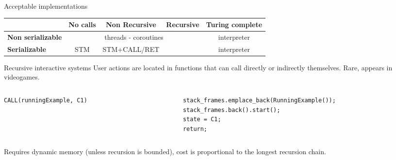 \documentclass[aspectratio=169,11pt]{beamer}
\begin{document}
\begin{frame}{Acceptable implementations}
\renewcommand{\arraystretch}{1.3} %
\setlength{\tabcolsep}{3pt}       %


\begin{tabularx}{\textwidth}{l|c|c|c|c}
\hline
 & \textbf{No calls}
 & \textbf{Non Recursive}
 & \textbf{Recursive}
 & \textbf{Turing complete} \\
\hline
    \textbf{Non serializable}       &  \multicolumn{3}{|c|}{threads - coroutines} & interpreter  \\
\hline
\textbf{Serializable}        & STM & STM+CALL/RET &  &  interpreter \\
\hline
\end{tabularx}
\end{frame}

\begin{frame}{Recursive interactive systems}
User actions are located in functions that can call directly or indirectly themselves.
Rare, appears in videogames.
\begin{columns}[T,onlytextwidth]
\begin{column}{0.50\textwidth}
\begin{lstlisting}[style=cppstyle, numbers=none]
CALL(runningExample, C1)
\end{lstlisting}
\end{column}
\begin{column}{0.48\textwidth}
\begin{lstlisting}[style=cppstyle, numbers=none]
stack_frames.emplace_back(RunningExample());
stack_frames.back().start();
state = C1;
return;
\end{lstlisting}
\end{column}
\end{columns}


Requires dynamic memory (unless recursion is bounded), cost is proportional to the longest recursion chain.
\end{frame}
\end{document}
